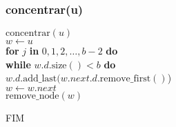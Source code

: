 \documentclass{beamer}
\begin{document}
\begin{frame}
\frametitle{concentrar(u)}
\begin{oframed}
\begin{flushleft}
\hspace*{1em} \ensuremath{\mathrm{concentrar}(\ensuremath{\mathit{u}})}\\
\hspace*{1em} \hspace*{1em} \ensuremath{\ensuremath{\mathit{w}} \gets  \ensuremath{u}}\\
\hspace*{1em} \hspace*{1em} {\color{black} \textbf{for}} \ensuremath{j} {\color{black} \textbf{in}} \ensuremath{0,1,2,\ldots,\ensuremath{\mathit{b}}-2} {\color{black} \textbf{do}} \\
\hspace*{1em} \hspace*{1em} \hspace*{1em} {\color{black} \textbf{while}} \ensuremath{\ensuremath{\mathit{w}}.\ensuremath{\mathit{d}}.\mathrm{size}() < b} {\color{black} \textbf{do}} \\
\hspace*{1em} \hspace*{1em} \hspace*{1em} \hspace*{1em} \ensuremath{\ensuremath{\mathit{w}}.\ensuremath{\mathit{d}}.\mathrm{add\_last}(\ensuremath{\mathit{w}}.\ensuremath{\mathit{next}}.\ensuremath{\mathit{d}}.\mathrm{remove\_first}()})\\
\hspace*{1em} \hspace*{1em} \hspace*{1em} \ensuremath{\ensuremath{\mathit{w}} \gets  \ensuremath{\ensuremath{\mathit{w}}.next}}\\
\hspace*{1em} \hspace*{1em} \ensuremath{\mathrm{remove\_node}(\ensuremath{\mathit{w}})}\\
\end{flushleft}
\end{oframed}
\end{frame}

\begin{frame}
FIM
\end{frame}
\end{document}
